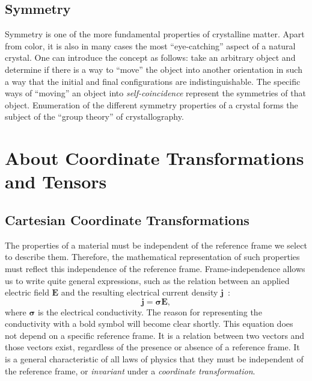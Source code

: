 \subsection{Symmetry\label{ssec:symmetry}}
Symmetry is one of the more fundamental properties of crystalline matter.  Apart from color, it is also in many cases the most ``eye-catching'' aspect of a natural crystal.  One can introduce the concept as follows: take an arbitrary object and determine if there is a way to ``move'' the object into another orientation in such a way that the initial and final configurations are indistinguishable.  The specific ways of ``moving'' an object into \textit{self-coincidence} represent the symmetries of that object.  Enumeration of the different symmetry properties of a crystal forms the subject of the ``group theory'' of crystallography.


\section{About Coordinate Transformations and Tensors}
\label{sec:transformations1}

\subsection[Cartesian Coordinate Transformations]{Cartesian Coordinate Transformations}

The properties of a material must be independent of the reference 
frame we select to describe them.  Therefore, the mathematical 
representation of such properties must reflect this independence of 
the reference frame.  Frame-independence allows us to write quite 
general expressions, such as the relation between an applied electric 
field $\mathbf{E}$ and the resulting electrical current density 
$\mathbf{j}$~:
\begin{equation}
	\mathbf{j}=\bm{\sigma}\mathbf{E},\label{eq:conductivity}
\end{equation}
where $\bm{\sigma}$ is the electrical conductivity.  The reason for 
representing the conductivity with a bold symbol will become clear shortly.
This equation does not depend on a specific reference frame. It is a relation between two vectors
and those vectors exist, regardless of the presence or absence of a reference frame.
It is a general characteristic of all laws of physics that they must be 
independent of the reference frame, or \textit{invariant} under a 
\textit{coordinate transformation}.

